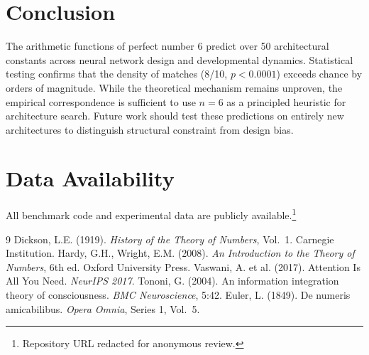 \documentclass[12pt]{article}
\begin{document}
\section{Conclusion}

The arithmetic functions of perfect number 6 predict over 50 architectural constants across neural network design and developmental dynamics. Statistical testing confirms that the density of matches (8/10, $p < 0.0001$) exceeds chance by orders of magnitude. While the theoretical mechanism remains unproven, the empirical correspondence is sufficient to use $n = 6$ as a principled heuristic for architecture search. Future work should test these predictions on entirely new architectures to distinguish structural constraint from design bias.

\section*{Data Availability}

All benchmark code and experimental data are publicly available.\footnote{Repository URL redacted for anonymous review.}

\begin{thebibliography}{9}
 Dickson, L.E. (1919). \emph{History of the Theory of Numbers}, Vol.~1. Carnegie Institution.
 Hardy, G.H., Wright, E.M. (2008). \emph{An Introduction to the Theory of Numbers}, 6th ed. Oxford University Press.
 Vaswani, A. et al. (2017). Attention Is All You Need. \emph{NeurIPS 2017}.
 Tononi, G. (2004). An information integration theory of consciousness. \emph{BMC Neuroscience}, 5:42.
 Euler, L. (1849). De numeris amicabilibus. \emph{Opera Omnia}, Series 1, Vol.~5.
\end{thebibliography}
\end{document}
